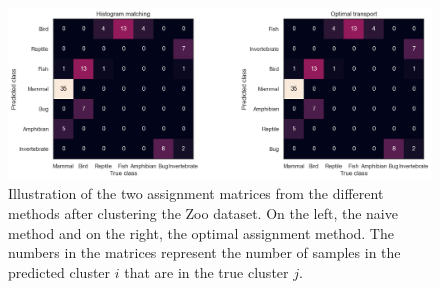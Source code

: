 \documentclass[a4paper,12pt]{article}
\begin{document}
\begin{figure}[H]
    \centering
    \includegraphics[width=\textwidth]{Attachments/assignment_method.png}
    \caption{Illustration of the two assignment matrices from the different methods after clustering the Zoo dataset. On the left, the naive method and on the right, the optimal assignment method.
    The numbers in the matrices represent the number of samples in the predicted cluster $i$ that are in the true cluster $j$.}
    \label{fig:assignment_methods}
\end{figure}
\end{document}
